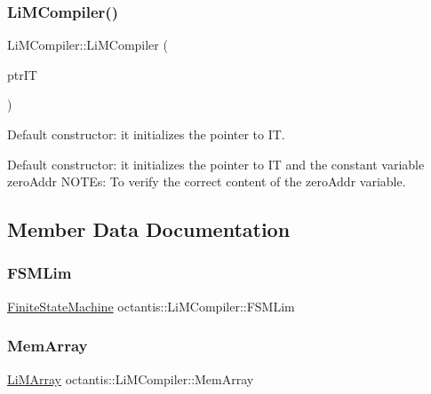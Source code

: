 \subsubsection{\texorpdfstring{Li\+M\+Compiler()}{LiMCompiler()}}
{\footnotesize\ttfamily Li\+M\+Compiler\+::\+Li\+M\+Compiler (\begin{DoxyParamCaption}\item[{\hyperlink{classoctantis_1_1InstructionTable}{Instruction\+Table} \&}]{ptr\+IT }\end{DoxyParamCaption})}



Default constructor\+: it initializes the pointer to IT. 

Default constructor\+: it initializes the pointer to IT and the constant variable zero\+Addr N\+O\+T\+Es\+: To verify the correct content of the zero\+Addr variable. 

\subsection{Member Data Documentation}
\mbox{\label{classoctantis_1_1LiMCompiler_af1779840f74fcbf74bdd7973082ed64d}} 
\subsubsection{\texorpdfstring{F\+S\+M\+Lim}{FSMLim}}
{\footnotesize\ttfamily \hyperlink{classoctantis_1_1FiniteStateMachine}{Finite\+State\+Machine} octantis\+::\+Li\+M\+Compiler\+::\+F\+S\+M\+Lim\hspace{0.3cm}{\ttfamily [protected]}}

\mbox{\label{classoctantis_1_1LiMCompiler_a11525f37ba87ad8a807407ce4b289c0d}} 
\subsubsection{\texorpdfstring{Mem\+Array}{MemArray}}
{\footnotesize\ttfamily \hyperlink{classoctantis_1_1LiMArray}{Li\+M\+Array} octantis\+::\+Li\+M\+Compiler\+::\+Mem\+Array\hspace{0.3cm}{\ttfamily [protected]}}



